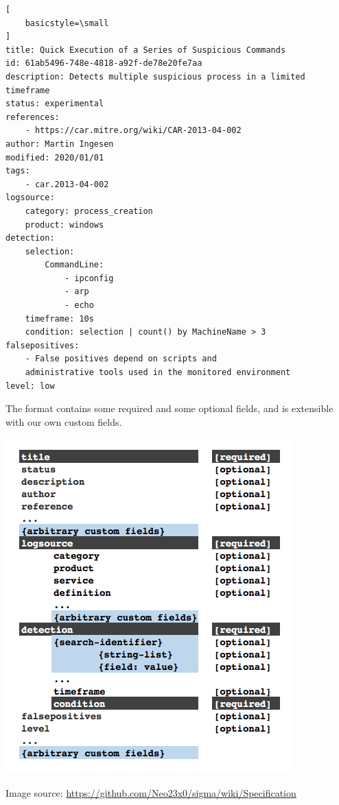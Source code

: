 \begin{lstlisting}[
    basicstyle=\small
]
title: Quick Execution of a Series of Suspicious Commands
id: 61ab5496-748e-4818-a92f-de78e20fe7aa
description: Detects multiple suspicious process in a limited timeframe
status: experimental
references:
    - https://car.mitre.org/wiki/CAR-2013-04-002
author: Martin Ingesen
modified: 2020/01/01
tags:
    - car.2013-04-002
logsource:
    category: process_creation
    product: windows
detection:
    selection:
        CommandLine:
            - ipconfig
            - arp
            - echo
    timeframe: 10s
    condition: selection | count() by MachineName > 3
falsepositives:
    - False positives depend on scripts and
    administrative tools used in the monitored environment
level: low
\end{lstlisting}
The format contains some required and some optional fields, and is extensible with our own custom fields.

\includegraphics[scale=0.525]{figures/new-rule-format/Sigma_Schema.png}

Image source: \url{https://github.com/Neo23x0/sigma/wiki/Specification}

